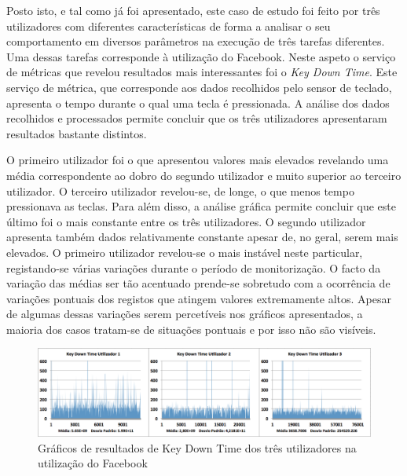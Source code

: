 Posto isto, e tal como já foi apresentado, este caso de estudo foi feito por três utilizadores com diferentes características de forma a analisar o seu comportamento em diversos parâmetros na execução de três tarefas diferentes. Uma dessas tarefas corresponde à utilização do Facebook. Neste aspeto o serviço de métricas que revelou resultados mais interessantes foi  o \textit{Key Down Time}. Este serviço de métrica, que corresponde aos dados recolhidos pelo sensor de teclado, apresenta o tempo durante o qual uma tecla é pressionada. A análise dos dados recolhidos e processados permite concluir que os três utilizadores apresentaram resultados bastante distintos.


O primeiro utilizador foi o que apresentou valores mais elevados revelando uma média correspondente ao dobro do segundo utilizador e muito superior ao terceiro utilizador. O terceiro utilizador revelou-se, de longe, o que menos tempo pressionava as teclas. Para além disso, a análise gráfica permite concluir que este último foi o mais constante entre os três utilizadores. O segundo utilizador apresenta também dados relativamente constante apesar de, no geral, serem mais elevados. O primeiro utilizador revelou-se o mais instável neste particular, registando-se várias variações durante o período de monitorização. O facto da variação das médias ser tão acentuado prende-se sobretudo com a ocorrência de variações pontuais dos registos que atingem valores extremamente altos. Apesar de algumas dessas variações serem percetíveis nos gráficos apresentados, a maioria dos casos tratam-se de situações pontuais e por isso não são visíveis.


\begin{figure}[htb]
   \centering
   \includegraphics[scale=0.35]{Images/keydowntime11.png}
   \caption{Gráficos de resultados de Key Down Time dos três utilizadores na utilização do Facebook}
\end{figure}

